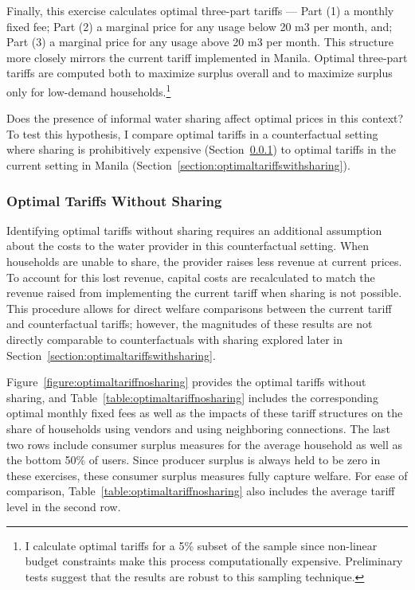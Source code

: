 \documentclass[12pt]{article}
\begin{document}
Finally, this exercise calculates optimal three-part tariffs --- Part (1) a monthly fixed fee; Part (2) a marginal price for any usage below 20 m3 per month, and; Part (3) a marginal price for any usage above 20 m3 per month.  This structure more closely mirrors the current tariff implemented in Manila.  Optimal three-part tariffs are computed both to maximize surplus overall and to maximize surplus only for low-demand households.\footnote{I calculate optimal tariffs for a 5\% subset of the sample since non-linear budget constraints make this process computationally expensive.  Preliminary tests suggest that the results are robust to this sampling technique.}

Does the presence of informal water sharing affect optimal prices in this context?  To test this hypothesis, I compare optimal tariffs in a counterfactual setting where sharing is prohibitively expensive (Section~\ref{section:optimaltariffswithoutsharing}) to optimal tariffs in the current setting in Manila (Section~\ref{section:optimaltariffswithsharing}).


\subsubsection{Optimal Tariffs Without Sharing}\label{section:optimaltariffswithoutsharing}

Identifying optimal tariffs without sharing requires an additional assumption about the costs to the water provider in this counterfactual setting.  When households are unable to share, the provider raises less revenue at current prices.  To account for this lost revenue, capital costs are recalculated to match the revenue raised from implementing the current tariff when sharing is not possible.  This procedure allows for direct welfare comparisons between the current tariff and counterfactual tariffs; however, the magnitudes of these results are not directly comparable to counterfactuals with sharing explored later in Section~\ref{section:optimaltariffswithsharing}.

Figure~\ref{figure:optimaltariffnosharing} provides the optimal tariffs without sharing, and Table~\ref{table:optimaltariffnosharing} includes the corresponding optimal monthly fixed fees as well as the impacts of these tariff structures on the share of households using vendors and using neighboring connections.  The last two rows include consumer surplus measures for the average household as well as the bottom 50\% of users.  Since producer surplus is always held to be zero in these exercises, these consumer surplus measures fully capture welfare.  For ease of comparison, Table~\ref{table:optimaltariffnosharing} also includes the average tariff level in the second row.
\end{document}
